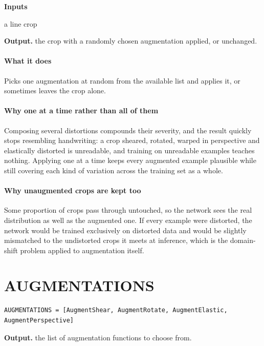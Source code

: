 \noindent\textbf{Inputs}
\begin{description}[leftmargin=2.2em,style=nextline,font=\normalfont\ttfamily]\setlength\itemsep{1pt}
  \item[{pilImg}] \normalfont a line crop
\end{description}

\noindent\textbf{Output.} the crop with a randomly chosen augmentation applied, or unchanged.


\paragraph{What it does}
Picks one augmentation at random from the available list and applies it, or sometimes leaves the crop alone.


\paragraph{Why one at a time rather than all of them}
Composing several distortions compounds their severity, and the result quickly stops resembling handwriting: a crop sheared, rotated, warped in perspective and elastically distorted is unreadable, and training on unreadable examples teaches nothing. Applying one at a time keeps every augmented example plausible while still covering each kind of variation across the training set as a whole.


\paragraph{Why unaugmented crops are kept too}
Some proportion of crops pass through untouched, so the network sees the real distribution as well as the augmented one. If every example were distorted, the network would be trained exclusively on distorted data and would be slightly mismatched to the undistorted crops it meets at inference, which is the domain-shift problem applied to augmentation itself.


\section{AUGMENTATIONS}
\begin{lstlisting}[style=sig]
AUGMENTATIONS = [AugmentShear, AugmentRotate, AugmentElastic, AugmentPerspective]
\end{lstlisting}

\noindent\textbf{Output.} the list of augmentation functions to choose from.


